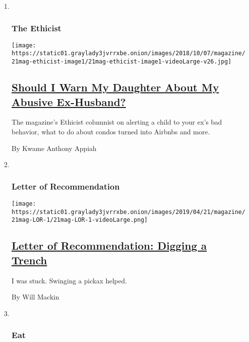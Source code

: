 \begin{enumerate}
\def\labelenumi{\arabic{enumi}.}
\item ~
  \hypertarget{the-ethicist}{%
  \subsubsection{The Ethicist}\label{the-ethicist}}

  \texttt{[image: https://static01.graylady3jvrrxbe.onion/images/2018/10/07/magazine/21mag-ethicist-image1/21mag-ethicist-image1-videoLarge-v26.jpg]}

  \hypertarget{should-i-warn-my-daughter-about-my-abusive-ex-husband}{%
  \subsection{\texorpdfstring{\href{/2019/04/16/magazine/ethicist-abusive-ex-husband.html}{Should
  I Warn My Daughter About My Abusive
  Ex-Husband?}}{Should I Warn My Daughter About My Abusive Ex-Husband?}}\label{should-i-warn-my-daughter-about-my-abusive-ex-husband}}

  The magazine's Ethicist columnist on alerting a child to your ex's bad
  behavior, what to do about condos turned into Airbnbs and more.

  By Kwame Anthony Appiah
\item ~
  \hypertarget{letter-of-recommendation}{%
  \subsubsection{Letter of
  Recommendation}\label{letter-of-recommendation}}

  \texttt{[image: https://static01.graylady3jvrrxbe.onion/images/2019/04/21/magazine/21mag-LOR-1/21mag-LOR-1-videoLarge.png]}

  \hypertarget{letter-of-recommendation-digging-a-trench}{%
  \subsection{\texorpdfstring{\href{/2019/04/16/magazine/letter-of-recommendation-digging-a-trench.html}{Letter
  of Recommendation: Digging a
  Trench}}{Letter of Recommendation: Digging a Trench}}\label{letter-of-recommendation-digging-a-trench}}

  I was stuck. Swinging a pickax helped.

  By Will Mackin
\item ~
  \hypertarget{eat}{%
  \subsubsection{Eat}\label{eat}}


\end{enumerate}
